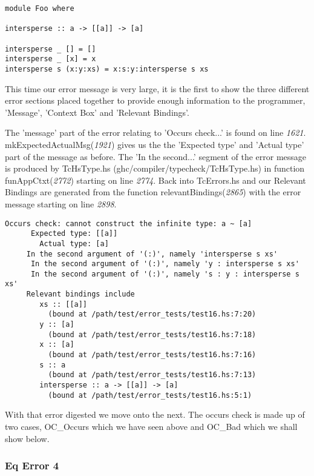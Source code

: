 \documentclass[a4paper]{article}
\begin{document}
\begin{lstlisting}[label={lst: T9.0}, numbers=none, caption={Example Program \cite{ex9}}]
module Foo where

intersperse :: a -> [[a]] -> [a]

intersperse _ [] = []
intersperse _ [x] = x
intersperse s (x:y:xs) = x:s:y:intersperse s xs
\end{lstlisting}

This time our error message is very large, it is the first to show the three different error sections placed together to provide enough information to the programmer, 'Message', 'Context Box' and 'Relevant Bindings'.  

The 'message' part of the error relating to 'Occurs check...' is found on line \textit{1621}.  mkExpectedActualMsg(\textit{1921})  gives us the the 'Expected type' and 'Actual type' part of the message as before. The 'In the second...' segment of the error message is produced by TcHsType.hs
(ghc/compiler/typecheck/TcHsType.hs) in function funAppCtxt(\textit{2772}) starting on line \textit{2774}. Back into TcErrors.hs and our Relevant Bindings are generated from the function relevantBindings(\textit{2865}) with the error message starting on line \textit{2898}.

\hfill \break
\hfill \break
\hfill \break
\hfill \break
\hfill \break
\hfill \break
\begin{lstlisting}[label={lst: T9.0.2}, numbers=none, caption={Error}]
Occurs check: cannot construct the infinite type: a ~ [a]
      Expected type: [[a]]
        Actual type: [a]
     In the second argument of '(:)', namely 'intersperse s xs'
      In the second argument of '(:)', namely 'y : intersperse s xs'
      In the second argument of '(:)', namely 's : y : intersperse s xs'
     Relevant bindings include
        xs :: [[a]]
          (bound at /path/test/error_tests/test16.hs:7:20)
        y :: [a]
          (bound at /path/test/error_tests/test16.hs:7:18)
        x :: [a]
          (bound at /path/test/error_tests/test16.hs:7:16)
        s :: a
          (bound at /path/test/error_tests/test16.hs:7:13)
        intersperse :: a -> [[a]] -> [a]
          (bound at /path/test/error_tests/test16.hs:5:1)
\end{lstlisting}

With that error digested we move onto the next. The occurs check is made up of two cases, OC\_Occurs which we have seen above and OC\_Bad which we shall show below. 

\subsubsection{Eq Error 4}
\end{document}

